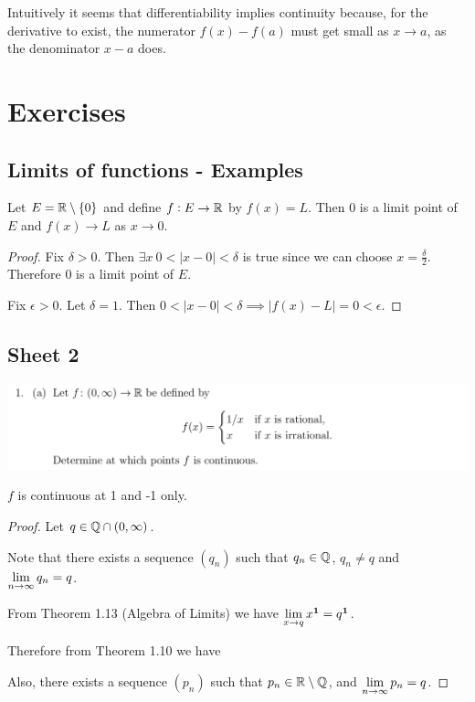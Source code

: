 \begin{remark*}
  Intuitively it seems that differentiability implies continuity because, for the derivative to
  exist, the numerator $f(x) - f(a)$ must get small as $x\to a$, as the denominator $x - a$ does.
\end{remark*}


\newpage
\section{Exercises}

\subsection{Limits of functions - Examples}

\begin{example}
  Let $E = \R\setminus \{0\}$ and define $f:E \to \R$ by $f(x) = L$. Then 0 is a limit point of
  $E$ and $f(x) \to L$ as $x \to 0$.
\end{example}

\begin{proof}
  Fix $\delta > 0$. Then $\exists x ~ 0 < |x - 0| < \delta$ is true since we can choose
  $x = \frac{\delta}{2}$. Therefore 0 is a limit point of $E$.

  Fix $\epsilon > 0$. Let $\delta = 1$. Then
  $0 < |x - 0| < \delta \implies |f(x) - L| = 0 < \epsilon$.
\end{proof}

\newpage
\subsection{Sheet 2}

\begin{mdframed}
  \includegraphics[width=400pt]{img/oxford-prelims-M2-analysis-II-sheet-2-1a.png}
\end{mdframed}

\begin{theorem*}
  $f$ is continuous at 1 and -1 only.
\end{theorem*}

\begin{proof} Let $q \in \Q \cap (0, \infty)$.

  Note that there exists a sequence $(q_n)$ such that $q_n \in \Q$, $q_n \neq q$ and
  $\LimEq{q_n}{q}{n}{\infty}$.

  From Theorem 1.13 (Algebra of Limits) we have $\Lim{x^\1}{x}{q} = q^\1$.

  Therefore from Theorem 1.10 we have


  Also, there exists a sequence $(p_n)$ such that $p_n \in \R\setminus\Q$, and
  $\LimEq{p_n}{q}{n}{\infty}$.


\end{proof}

